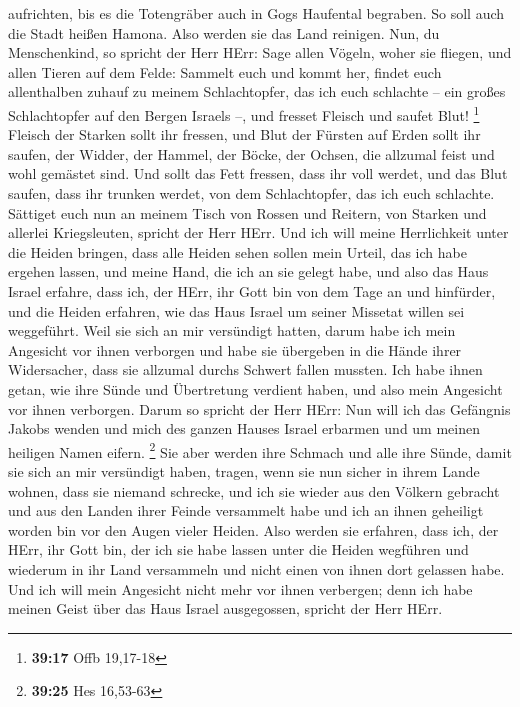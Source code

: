 aufrichten, bis es die Totengräber auch in Gogs Haufental begraben.
 So soll auch die Stadt heißen Hamona. Also werden sie
das Land reinigen.  Nun, du Menschenkind, so spricht der
Herr HErr: Sage allen Vögeln, woher sie fliegen, und allen Tieren auf
dem Felde: Sammelt euch und kommt her, findet euch allenthalben zuhauf
zu meinem Schlachtopfer, das ich euch schlachte -- ein großes
Schlachtopfer auf den Bergen Israels --, und fresset Fleisch und saufet
Blut! \footnote{\textbf{39:17} Offb 19,17-18}  Fleisch
der Starken sollt ihr fressen, und Blut der Fürsten auf Erden sollt ihr
saufen, der Widder, der Hammel, der Böcke, der Ochsen, die allzumal
feist und wohl gemästet sind.  Und sollt das Fett
fressen, dass ihr voll werdet, und das Blut saufen, dass ihr trunken
werdet, von dem Schlachtopfer, das ich euch schlachte. 
Sättiget euch nun an meinem Tisch von Rossen und Reitern, von Starken
und allerlei Kriegsleuten, spricht der Herr HErr.  Und
ich will meine Herrlichkeit unter die Heiden bringen, dass alle Heiden
sehen sollen mein Urteil, das ich habe ergehen lassen, und meine Hand,
die ich an sie gelegt habe,  und also das Haus Israel
erfahre, dass ich, der HErr, ihr Gott bin von dem Tage an und hinfürder,
 und die Heiden erfahren, wie das Haus Israel um seiner
Missetat willen sei weggeführt. Weil sie sich an mir versündigt hatten,
darum habe ich mein Angesicht vor ihnen verborgen und habe sie übergeben
in die Hände ihrer Widersacher, dass sie allzumal durchs Schwert fallen
mussten.  Ich habe ihnen getan, wie ihre Sünde und
Übertretung verdient haben, und also mein Angesicht vor ihnen verborgen.
 Darum so spricht der Herr HErr: Nun will ich das
Gefängnis Jakobs wenden und mich des ganzen Hauses Israel erbarmen und
um meinen heiligen Namen eifern. \footnote{\textbf{39:25} Hes 16,53-63}
 Sie aber werden ihre Schmach und alle ihre Sünde, damit
sie sich an mir versündigt haben, tragen, wenn sie nun sicher in ihrem
Lande wohnen, dass sie niemand schrecke,  und ich sie
wieder aus den Völkern gebracht und aus den Landen ihrer Feinde
versammelt habe und ich an ihnen geheiligt worden bin vor den Augen
vieler Heiden.  Also werden sie erfahren, dass ich, der
HErr, ihr Gott bin, der ich sie habe lassen unter die Heiden wegführen
und wiederum in ihr Land versammeln und nicht einen von ihnen dort
gelassen habe.  Und ich will mein Angesicht nicht mehr
vor ihnen verbergen; denn ich habe meinen Geist über das Haus Israel
ausgegossen, spricht der Herr HErr.

